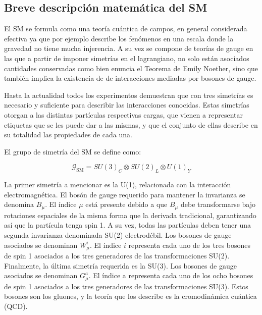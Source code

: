 



\subsection{Breve descripción matemática del SM}

El SM se formula como una teoría cuántica de campos, en general considerada efectiva ya que por ejemplo describe los fenómenos en una escala donde la gravedad no tiene mucha injerencia. A su vez se compone de teorías de gauge en las que a partir de imponer simetrías en el lagrangiano, no solo están asociados cantidades conservadas como bien enuncia el Teorema de Emily Noether, sino que también implica la existencia de de interacciones mediadas por bosones de gauge. 

Hasta la actualidad todos los experimentos demuestran que con tres simetrías es necesario y suficiente para describir las interacciones conocidas. Estas simetrías otorgan a las distintas partículas respectivas cargas, que vienen a representar etiquetas que se les puede dar a las mismas, y que el conjunto de ellas describe en su totalidad las propiedades de cada una.

El grupo de simetría del SM se define como:

\begin{equation}
	\mathcal{G}_{\text{SM}} = SU(3)_C \otimes SU(2)_L \otimes U(1)_Y
\end{equation}

La primer simetría a mencionar es la U(1), relacionada con la interacción electromagnética. El bosón de gauge requerido para mantener la invarianza se denomina $B_{\mu}$. El  índice $\mu$ está presente debido a que $B_{\mu}$ debe transformarse bajo rotaciones espaciales de la misma forma que la derivada tradicional, garantizando así que la partícula tenga spin 1.
A su vez, todas las partículas deben tener una segunda invarianza denominada SU(2) electrodébil. Los bosones de gauge asociados se denominan $W_{\mu}^{i}$. El índice $i$ representa cada uno de los tres bosones de spin 1  asociados a los tres generadores de las transformaciones SU(2).
Finalmente, la última simetría requerida es la SU(3). Los bosones de gauge asociados se denominan $G_{\mu}^{a}$. El índice a representa cada uno de los ocho bosones de spin 1  asociados a los tres generadores de las transformaciones SU(3). Estos bosones son los gluones, y la teoría que los describe es la cromodinámica cuántica (QCD).

